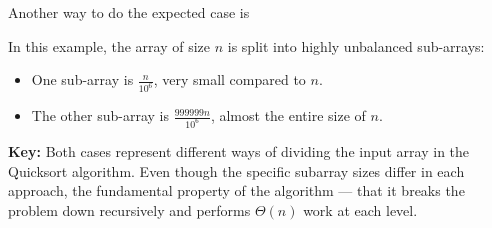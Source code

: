     \begin{intuition}
        Another way to do the expected case is 
        \begin{center}
        \end{center}
        
        \noindent In this example, the array of size \( n \) is split into highly unbalanced sub-arrays:
        \begin{itemize}
            \item One sub-array is \( \frac{n}{10^6} \), very small compared to \( n \).
            \item The other sub-array is \( \frac{999999n}{10^6} \), almost the entire size of \( n \).
        \end{itemize}
        \vspace{1em}

        \textbf{Key:} Both cases represent different ways of dividing the input array in the Quicksort algorithm. Even though the specific subarray sizes differ in each approach, the fundamental property of the algorithm — that it breaks the problem down recursively and performs $\Theta(n)$ work at each level.
    \end{intuition}

